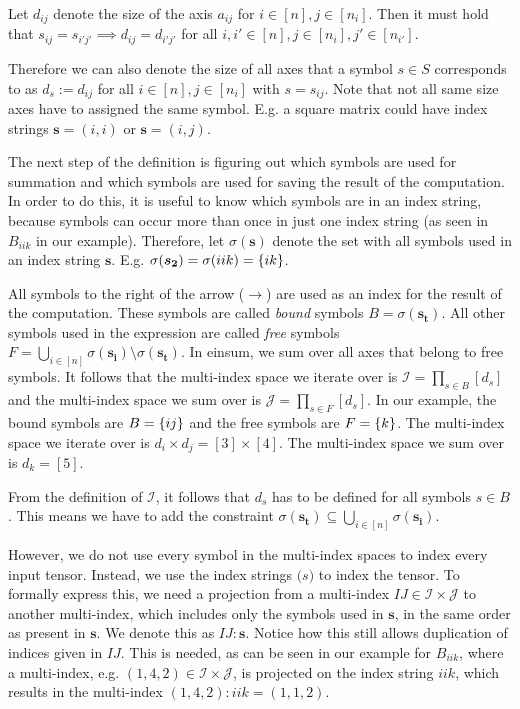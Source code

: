 \begin{definition}
    Let $d_{ij}$ denote the size of the axis $a_{ij}$ for $i \in [n], j \in [n_i]$.
    Then it must hold that $s_{ij} = s_{i'j'} \implies d_{ij} = d_{i'j'}$ for all $i,i' \in [n], j \in [n_i], j' \in [n_{i'}]$.

    Therefore we can also denote the size of all axes that a symbol $s \in S$ corresponds to as $d_s := d_{ij}$ for all $i \in [n], j \in [n_i]$ with $s = s_{ij}$.
    Note that not all same size axes have to assigned the same symbol. E.g. a square matrix could have index strings $\bm{s} = (i, i)$ or $\bm{s} = (i, j)$.

    The next step of the definition is figuring out which symbols are used for summation and which symbols are used for saving the result of the computation.
    In order to do this, it is useful to know which symbols are in an index string, because symbols can occur more than once in just one index string (as seen in $B_{iik}$ in our example).
    Therefore, let $\sigma(\bm{s})$ denote the set with all symbols used in an index string $\bm{s}$.
    E.g. $\sigma(\bm{s_2}) = \sigma(iik) = \lbrace ik \rbrace$.

    All symbols to the right of the arrow ($\rightarrow$) are used as an index for the result of the computation.
    These symbols are called \textit{bound} symbols $B = \sigma(\bm{s_t})$.
    All other symbols used in the expression are called \textit{free} symbols $F = \bigcup_{i \in [n]} \sigma(\bm{s_i}) \setminus \sigma(\bm{s_t})$.
    In einsum, we sum over all axes that belong to free symbols.
    It follows that the multi-index space we iterate over is $\mathcal{I} = \prod_{s \in B} [d_s]$ and the multi-index space we sum over is $\mathcal{J} = \prod_{s \in F} [d_s]$.
    In our example, the bound symbols are $B = \lbrace ij \rbrace$ and the free symbols are $F = \lbrace k \rbrace$.
    The multi-index space we iterate over is $d_i \times d_j = [3] \times [4]$.
    The multi-index space we sum over is $d_k = [5]$.

    From the definition of $\mathcal{I}$, it follows that $d_s$ has to be defined for all symbols $s \in B$.
    This means we have to add the constraint $\sigma(\bm{s_t}) \subseteq \bigcup_{i \in [n]} \sigma(\bm{s_i})$.

    However, we do not use every symbol in the multi-index spaces to index every input tensor.
    Instead, we use the index strings $\bm(s)$ to index the tensor.
    To formally express this, we need a projection from a multi-index $IJ \in \mathcal{I} \times \mathcal{J}$ to another multi-index, which includes only the symbols used in $\bm{s}$,
    in the same order as present in $\bm{s}$.
    We denote this as $IJ:\bm{s}$.
    Notice how this still allows duplication of indices given in $IJ$.
    This is needed, as can be seen in our example for $B_{iik}$,
    where a multi-index, e.g. $(1,4,2) \in \mathcal{I} \times \mathcal{J}$, is projected on the index string $iik$,
    which results in the multi-index $(1,4,2):iik = (1,1,2)$.


\end{definition}
